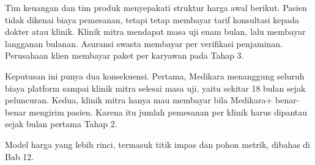\begin{kasus}[title={Kasus Medikara Health: Siapa yang Menanggung Biaya Platform?}]
Tim keuangan dan tim produk menyepakati struktur harga awal berikut. Pasien
tidak dikenai biaya pemesanan, tetapi tetap membayar tarif konsultasi kepada
dokter atau klinik. Klinik mitra mendapat masa uji enam bulan, lalu membayar
langganan bulanan. Asuransi swasta membayar per verifikasi penjaminan.
Perusahaan klien membayar paket per karyawan pada Tahap 3.

Keputusan ini punya dua konsekuensi. Pertama, Medikara menanggung seluruh biaya
platform sampai klinik mitra selesai masa uji, yaitu sekitar 18 bulan sejak
peluncuran. Kedua, klinik mitra hanya mau membayar bila Medikara+ benar-benar
mengirim pasien. Karena itu jumlah pemesanan per klinik harus dipantau sejak
bulan pertama Tahap 2.

Model harga yang lebih rinci, termasuk titik impas dan pohon metrik, dibahas di
Bab 12.
\end{kasus}


